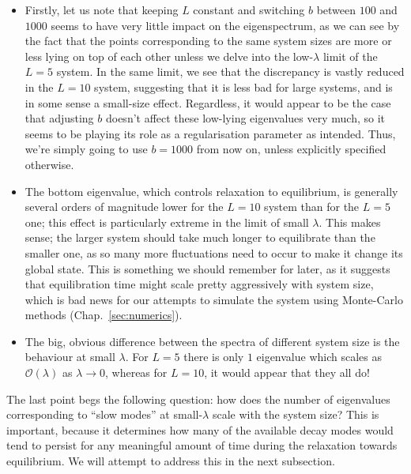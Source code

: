 \begin{itemize}
 \item Firstly, let us note that keeping $L$ constant and switching $b$ between $100$
 and $1000$ seems to have very little impact on the eigenspectrum, as we can see by the fact that the points corresponding to the same system sizes are
 more or less lying on top of each other unless we delve into the low-$\lambda$ limit
 of the $L=5$ system. In the same limit, we see that the discrepancy is vastly reduced
 in the $L=10$ system, suggesting that it is less bad for large systems, and is in some sense a small-size effect. Regardless, it would appear to be the case that adjusting $b$
 doesn't affect these low-lying eigenvalues very much, so it seems to be playing its
 role as a regularisation parameter as intended. Thus, we're simply going to use $b=1000$
 from now on, unless explicitly specified otherwise.
 \item The bottom eigenvalue, which controls relaxation to equilibrium, is generally
 several orders of magnitude lower for the $L=10$ system than for the $L=5$ one;
 this effect is particularly extreme in the limit of small $\lambda$.
 This makes sense; the larger system should take much longer to equilibrate than the
 smaller one, as so many more fluctuations need to occur to make it change its global
 state. This is something we should remember for later, as it suggests that equilibration time might scale
 pretty aggressively with system size, which is bad news for our attempts to simulate
 the system using Monte-Carlo methods (Chap.~\ref{sec:numerics}).
 \item The big, obvious difference between the spectra of different system size is
 the behaviour at small $\lambda$. For $L=5$ there is only $1$ eigenvalue which scales
 as $\mathcal{O}(\lambda)$ as $\lambda \rightarrow 0$, whereas for $L=10$, it would
 appear that they all do!
\end{itemize}
The last point begs the following question: how does the number of eigenvalues
corresponding to ``slow modes'' at small-$\lambda$ scale with the system size? This is 
important,
because it determines how many of the available decay modes would tend to persist for any 
meaningful amount of time during the relaxation towards equilibrium. We will attempt to
address this in the next subsection.

